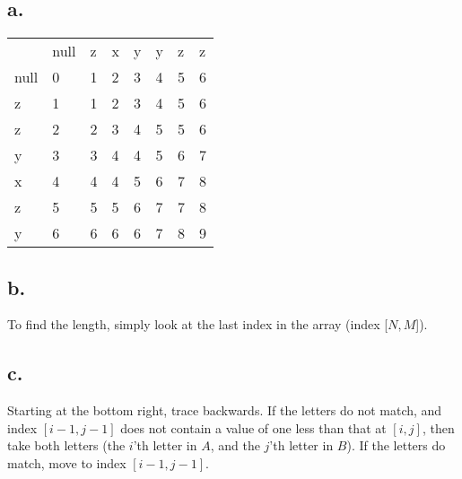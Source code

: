 \documentclass[letterpaper,notitlepage,twoside]{article}
\begin{document}
\subsection*{a.}

\begin{tabular}{llllllll}
     & null & z & x & y & y & z & z \\
null & 0    & 1 & 2 & 3 & 4 & 5 & 6 \\
z    & 1    & 1 & 2 & 3 & 4 & 5 & 6 \\
z    & 2    & 2 & 3 & 4 & 5 & 5 & 6 \\
y    & 3    & 3 & 4 & 4 & 5 & 6 & 7 \\
x    & 4    & 4 & 4 & 5 & 6 & 7 & 8 \\
z    & 5    & 5 & 5 & 6 & 7 & 7 & 8 \\
y    & 6    & 6 & 6 & 6 & 7 & 8 & 9 \\
\end{tabular}

\subsection*{b.}
To find the length, simply look at the last index in the array (index [$N,M$]).  
\subsection*{c.}
Starting at the bottom right, trace backwards. If the letters do not match, and index $[i-1, j-1]$ does not contain a value of one less than that at $[i, j]$, then take both letters (the $i$'th letter in $A$, and the $j$'th letter in $B$). If the letters do match, move to index $[i-1, j-1]$. 
\end{document}
